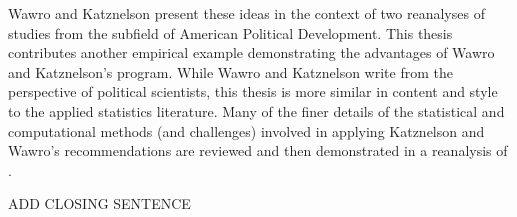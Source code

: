 Wawro and Katznelson present these ideas in the context of two reanalyses of studies from the subfield of American Political Development. This thesis contributes another empirical example demonstrating the advantages of Wawro and Katznelson's program. While Wawro and Katznelson write from the perspective of political scientists, this thesis is more similar in content and style to the applied statistics literature. Many of the finer details of the statistical and computational methods (and challenges) involved in applying Katznelson and Wawro's recommendations are reviewed and then demonstrated in a reanalysis of . 

ADD CLOSING SENTENCE



